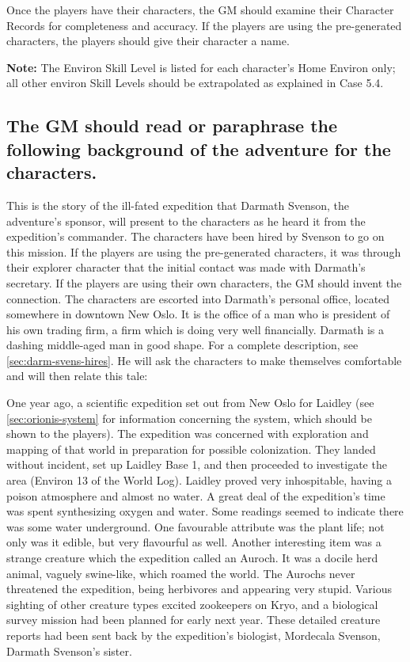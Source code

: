 Once the players have their characters, the GM should examine their
Character Records for completeness and accuracy.  If the players are
using the pre-generated characters, the players should give their
character a name.

\textbf{Note:} The Environ Skill Level is listed for each character's
Home Environ only; all other environ Skill Levels should be
extrapolated as explained in Case 5.4.

\subsection[Player Background]{The GM should read or paraphrase the
  following background 
  of the adventure for the characters.}
\label{sec:gm-should-read}

This is the story of the ill-fated expedition that Darmath Svenson,
the adventure's sponsor, will present to the characters as he heard it
from the expedition's commander. The characters have been hired by
Svenson to go on this mission. If the players are using the
pre-generated characters, it was through their explorer character that
the initial contact was made with Darmath's secretary. If the players
are using their own characters, the GM should invent the connection.
The characters are escorted into Darmath's personal office, located
somewhere in downtown New Oslo. It is the office of a man who is
president of his own trading firm, a firm which is doing very well
financially. Darmath is a dashing middle-aged man in good shape. For a
complete description, see \ref{sec:darm-svens-hires}. He will ask the
characters to make themselves comfortable and will then relate this
tale:

One year ago, a scientific expedition set out from New Oslo for
Laidley (see \ref{sec:orionis-system} for information concerning the
system, which should be shown to the players). The expedition was
concerned with exploration and mapping of that world in preparation
for possible colonization. They landed without incident, set up
Laidley Base 1, and then proceeded to investigate the area (Environ 13
of the World Log).  Laidley proved very inhospitable, having a poison
atmosphere and almost no water. A great deal of the expedition's time
was spent synthesizing oxygen and water. Some readings seemed to
indicate there was some water underground. One favourable attribute
was the plant life; not only was it edible, but very flavourful as
well. Another interesting item was a strange creature which the
expedition called an Auroch. It was a docile herd animal, vaguely
swine-like, which roamed the world. The Aurochs never threatened the
expedition, being herbivores and appearing very stupid. Various
sighting of other creature types excited zookeepers on Kryo, and a
biological survey mission had been planned for early next year. These
detailed creature reports had been sent back by the expedition's
biologist, Mordecala Svenson, Darmath Svenson's sister.  

